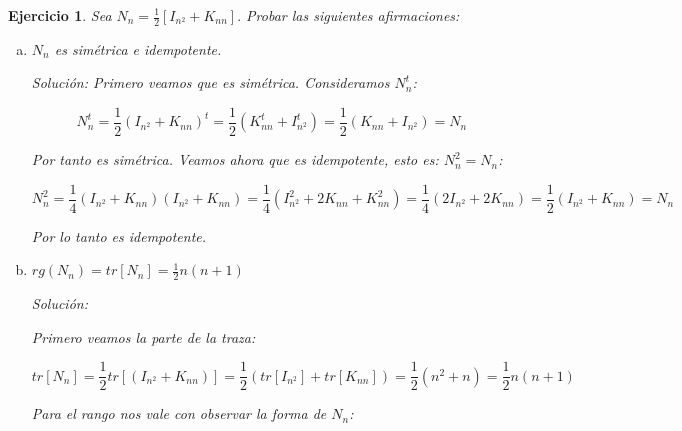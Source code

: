\documentclass{article}
\theoremstyle{theorem-style}  %
\theoremstyle{definition-style}
\theoremstyle{example-style}
\theoremstyle{exercise-style}
\newtheorem{exercise}{Ejercicio}[section]
\begin{document}
	

	\begin{exercise}
		Sea $N_n = \frac{1}{2}[I_{n^2}+K_{nn}].$ Probar las siguientes afirmaciones:
		\begin{enumerate}[a)]
			\item $N_n$ es simétrica e idempotente.
			
			\textit{Solución:}
			Primero veamos que es simétrica. Consideramos $N_n^t$:
			
			$$N_n^t = \frac{1}{2}(I_{n^2}+K_{nn})^t = \frac{1}{2}(K_{nn}^t + I_{n^2}^t) = \frac{1}{2}(K_{nn} + I_{n^2}) = N_n$$
			
			Por tanto es simétrica. Veamos ahora que es idempotente, esto es: $N_n^2 = N_n$:
			
			$$ N_n^2=\frac{1}{4}(I_{n^2} + K_{nn})(I_{n^2} + K_{nn}) = \frac{1}{4}(I_{n^2}^2 + 2K_{nn} +  K_{nn}^2) = \frac{1}{4}(2I_{n^2} + 2K_{nn}) = \frac{1}{2}(I_{n^2} + K_{nn}) = N_n $$ 
			
			Por lo tanto es idempotente.
			
			\item $rg(N_n) = tr[N_n] = \frac{1}{2}n(n+1)$
			
			\textit{Solución:}
			
			Primero veamos la parte de la traza:
			
			$$tr[N_n] = \frac{1}{2}tr[(I_{n^2} + K_{nn})] = \frac{1}{2}(tr[I_{n^2}]+tr[K_{nn}]) = \frac{1}{2}(n^2 + n) = \frac{1}{2}n(n+1)$$
			
			Para el rango nos vale con observar la forma de $N_n$:
			

\end{enumerate}
\end{exercise}
\end{document}
